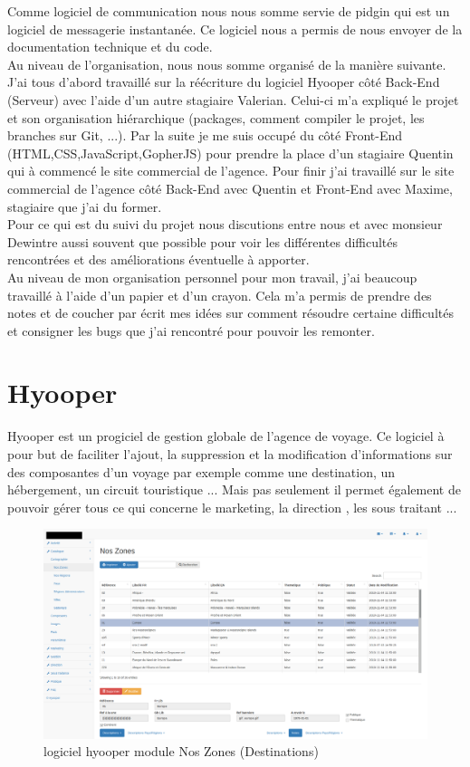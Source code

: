 \documentclass[12pt,a4paper]{report}
\begin{document}
Comme logiciel de communication nous nous somme servie de pidgin qui est un logiciel de messagerie instantanée. Ce logiciel nous a permis de nous envoyer de la documentation technique et du code.\\
\newpage
Au niveau de l'organisation, nous nous somme organisé de la manière  suivante. J'ai tous d'abord travaillé sur la réécriture du logiciel Hyooper côté Back-End (Serveur)  avec l'aide d'un autre stagiaire Valerian. Celui-ci m'a expliqué le projet et son organisation hiérarchique (packages, comment compiler le projet, les branches sur Git, ...). Par la suite je me suis occupé du côté Front-End (HTML,CSS,JavaScript,GopherJS) pour prendre la place d'un stagiaire Quentin qui à commencé le site commercial de l'agence. Pour finir j'ai travaillé sur le site commercial de l'agence côté Back-End avec Quentin  et Front-End avec Maxime, stagiaire que j'ai du former.\\

Pour ce qui est du suivi du projet nous discutions entre nous et avec monsieur Dewintre aussi souvent que possible pour voir les différentes difficultés rencontrées et des améliorations éventuelle à apporter.\\

Au niveau de mon organisation personnel pour mon travail, j'ai beaucoup travaillé à l'aide d'un papier et d'un crayon. Cela m'a permis de prendre des notes et de coucher par écrit mes idées sur comment résoudre certaine difficultés et consigner les bugs que j'ai rencontré pour pouvoir les remonter.\\

\section{Hyooper}

Hyooper est un progiciel de gestion globale de l'agence de voyage. Ce logiciel à pour but de faciliter l'ajout, la suppression et la modification d'informations sur des composantes d'un voyage par exemple comme  une destination, un hébergement, un circuit touristique ... Mais pas seulement il permet également de pouvoir gérer tous ce qui concerne le marketing, la direction , les sous traitant ...\\

\begin{figure}[h]
\centerline{\includegraphics[scale=0.3]{hyooper.png}}
\caption{logiciel hyooper module Nos Zones (Destinations)}
\label{image_hyooper}
\end{figure}
\end{document}

